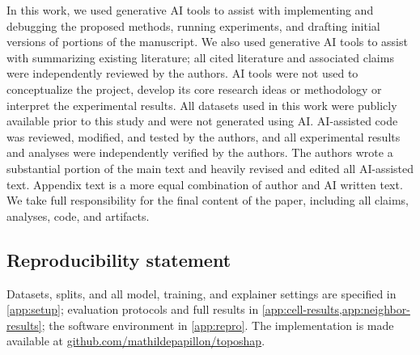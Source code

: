 \documentclass{article} %
\begin{document}
In this work, we used generative AI tools to assist with implementing and debugging the proposed methods, running experiments, and drafting initial versions of portions of the manuscript. We also used generative AI tools to assist with summarizing existing literature; all cited literature and associated claims were independently reviewed by the authors. AI tools were not used to conceptualize the project, develop its core research ideas or methodology or interpret the experimental results. All datasets used in this work were publicly available prior to this study and were not generated using AI. AI-assisted code was reviewed, modified, and tested by the authors, and all experimental results and analyses were independently verified by the authors. The authors wrote a substantial portion of the main text and heavily revised and edited all AI-assisted text. Appendix text is a more equal combination of author and AI written text. We take full responsibility for the final content of the paper, including all claims, analyses, code, and artifacts.

\subsection*{Reproducibility statement}
Datasets, splits, and all model, training, and explainer settings are specified in \cref{app:setup}; evaluation protocols and full results in \cref{app:cell-results,app:neighbor-results}; the software environment in \cref{app:repro}. The implementation is made available at \href{https://github.com/mathildepapillon/toposhap}{github.com/mathildepapillon/toposhap}.




\clearpage
\appendix





\end{document}
